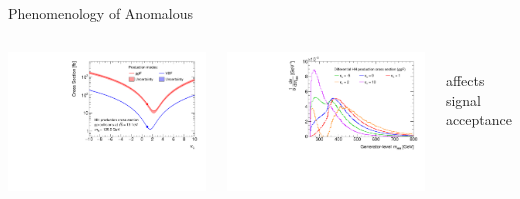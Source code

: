 \documentclass[11pt, xcolor={dvipsnames}, aspectratio=169]{beamer}
\begin{document}
\begin{frame}{Phenomenology of Anomalous \allbold{\klambda}}
  \begin{columns}[t]
    \centering

    \includegraphics[width=\textwidth]{self_coupling/hh_xsec}


    \centering

    \includegraphics[width=\textwidth]{self_coupling/hh_mhh_vs_klam}

    \\
    \ra affects signal acceptance

  \end{columns}
\end{frame}
\end{document}
